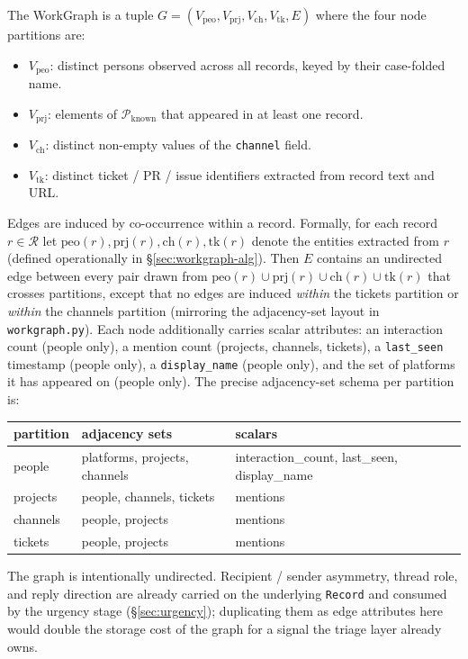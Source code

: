 The WorkGraph is a tuple $G = (V_{\mathrm{peo}}, V_{\mathrm{prj}}, V_{\mathrm{ch}}, V_{\mathrm{tk}}, E)$ where the four node partitions are:
\begin{itemize}
  \setlength\itemsep{0.15em}
  \item $V_{\mathrm{peo}}$: distinct persons observed across all records, keyed by their case-folded name.
  \item $V_{\mathrm{prj}}$: elements of $\mathcal{P}_{\text{known}}$ that appeared in at least one record.
  \item $V_{\mathrm{ch}}$: distinct non-empty values of the \texttt{channel} field.
  \item $V_{\mathrm{tk}}$: distinct ticket / PR / issue identifiers extracted from record text and URL.
\end{itemize}
Edges are induced by co-occurrence within a record. Formally, for each record $r \in \mathcal{R}$ let $\mathrm{peo}(r), \mathrm{prj}(r), \mathrm{ch}(r), \mathrm{tk}(r)$ denote the entities extracted from $r$ (defined operationally in \S\ref{sec:workgraph-alg}). Then $E$ contains an undirected edge between every pair drawn from $\mathrm{peo}(r) \cup \mathrm{prj}(r) \cup \mathrm{ch}(r) \cup \mathrm{tk}(r)$ that crosses partitions, except that no edges are induced \emph{within} the tickets partition or \emph{within} the channels partition (mirroring the adjacency-set layout in \texttt{workgraph.py}). Each node additionally carries scalar attributes: an interaction count (people only), a mention count (projects, channels, tickets), a \texttt{last\_seen} timestamp (people only), a \texttt{display\_name} (people only), and the set of platforms it has appeared on (people only). The precise adjacency-set schema per partition is:
\begin{center}
\begin{tabular}{lll}
\toprule
partition & adjacency sets & scalars \\
\midrule
people    & platforms, projects, channels & interaction\_count, last\_seen, display\_name \\
projects  & people, channels, tickets     & mentions \\
channels  & people, projects              & mentions \\
tickets   & people, projects              & mentions \\
\bottomrule
\end{tabular}
\end{center}

The graph is intentionally undirected. Recipient / sender asymmetry, thread role, and reply direction are already carried on the underlying \texttt{Record} and consumed by the urgency stage (\S\ref{sec:urgency}); duplicating them as edge attributes here would double the storage cost of the graph for a signal the triage layer already owns.

